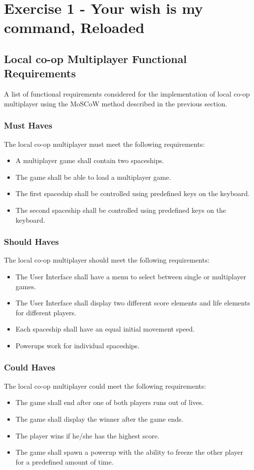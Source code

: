 \section{Exercise 1 - Your wish is my command, Reloaded }
\subsection{Local co-op Multiplayer Functional Requirements}

A list of functional requirements considered for the implementation of local co-op multiplayer using the MoSCoW method described in the previous section.

\subsubsection{Must Haves}
The local co-op multiplayer must meet the following requirements:
\begin{itemize}
	\item A multiplayer game shall contain two spaceships.
	\item The game shall be able to load a multiplayer game.
	\item The first spaceship shall be controlled using predefined keys on the keyboard.
	\item The second spaceship shall be controlled using predefined keys on the keyboard.
\end{itemize}

\subsubsection{Should Haves}
The local co-op multiplayer should meet the following requirements:
\begin{itemize}
	\item The User Interface shall have a menu to select between single or multiplayer games.
	\item The User Interface shall display two different score elements and life elements for different players.
	\item Each spaceship shall have an equal initial movement speed.
	\item Powerups work for individual spaceships.
\end{itemize}

\subsubsection{Could Haves}
The local co-op multiplayer could meet the following requirements:
\begin{itemize}
	\item The game shall end after one of both players runs out of lives.
	\item The game shall display the winner after the game ends.
	\item The player wins if he/she has the highest score.
	\item The game shall spawn a powerup with the ability to freeze the other player for a predefined amount of time.
\end{itemize}

